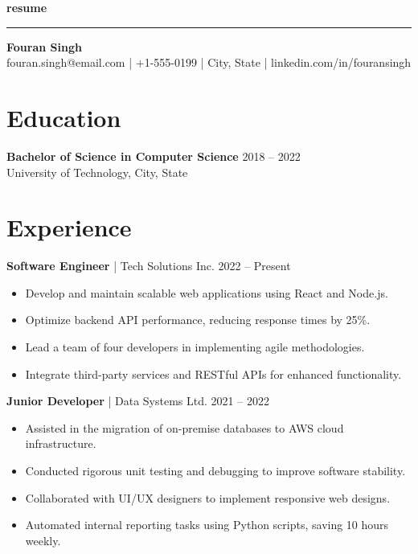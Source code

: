 \documentclass[11pt, a4paper]{article}
\begin{document}
\begin{center}
    {\LARGE \textbf{resume}}\\[0.35em]
    {\normalsize }
\end{center}

\vspace{0.4em}
\hrule
\vspace{0.8em}

\begin{center}
{\huge \textbf{Fouran Singh}} \\
fouran.singh@email.com | +1-555-0199 | City, State | linkedin.com/in/fouransingh
\end{center}

\section*{Education}
\textbf{Bachelor of Science in Computer Science} \hfill 2018 -- 2022 \\
University of Technology, City, State

\section*{Experience}
\textbf{Software Engineer} | Tech Solutions Inc. \hfill 2022 -- Present
\begin{itemize}
    \item Develop and maintain scalable web applications using React and Node.js.
    \item Optimize backend API performance, reducing response times by 25\%.
    \item Lead a team of four developers in implementing agile methodologies.
    \item Integrate third-party services and RESTful APIs for enhanced functionality.
\end{itemize}

\textbf{Junior Developer} | Data Systems Ltd. \hfill 2021 -- 2022
\begin{itemize}
    \item Assisted in the migration of on-premise databases to AWS cloud infrastructure.
    \item Conducted rigorous unit testing and debugging to improve software stability.
    \item Collaborated with UI/UX designers to implement responsive web designs.
    \item Automated internal reporting tasks using Python scripts, saving 10 hours weekly.
\end{itemize}
\end{document}

